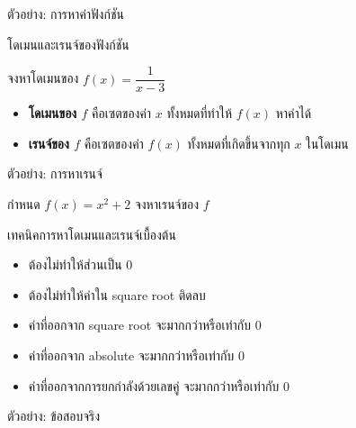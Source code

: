 \documentclass[11pt, aspectratio=169]{beamer}
\begin{document}
\begin{frame}[t]{ตัวอย่าง: การหาค่าฟังก์ชัน}
  \vspace{\fill}

\end{frame}\begin{frame}[t]{โดเมนและเรนจ์ของฟังก์ชัน}
  \begin{exambox}[โจทย์]
    จงหาโดเมนของ $f(x) = \dfrac{1}{x - 3}$
  \end{exambox}

  \begin{itemize}
    \item \textbf{โดเมนของ $f$} คือเซตของค่า $x$ ทั้งหมดที่ทำให้ $f(x)$ หาค่าได้
    \item \textbf{เรนจ์ของ $f$} คือเซตของค่า $f(x)$ ทั้งหมดที่เกิดขึ้นจากทุก $x$ ในโดเมน
  \end{itemize}

  \vspace{\fill}

\end{frame}\begin{frame}[t]{ตัวอย่าง: การหาเรนจ์}
  \begin{exambox}[โจทย์]
    กำหนด $f(x) = x^2 + 2$ จงหาเรนจ์ของ $f$
  \end{exambox}

  \vspace{\fill}

\end{frame}\begin{frame}{เทคนิคการหาโดเมนและเรนจ์เบื้องต้น}
  \begin{explanation}[โดเมน]
    \begin{itemize}
      \item ต้องไม่ทำให้ส่วนเป็น 0
      \item ต้องไม่ทำให้ค่าใน square root ติดลบ
    \end{itemize}
  \end{explanation}
  \begin{explanation}[เรนจ์]
    \begin{itemize}
      \item ค่าที่ออกจาก square root จะมากกว่าหรือเท่ากับ 0
      \item ค่าที่ออกจาก absolute จะมากกว่าหรือเท่ากับ 0
      \item ค่าที่ออกจากการยกกำลังด้วยเลขคู่ จะมากกว่าหรือเท่ากับ 0
    \end{itemize}
  \end{explanation}
\end{frame}\begin{frame}[t]{ตัวอย่าง: ข้อสอบจริง}

  \vspace{\fill}

\end{frame}
\end{document}
